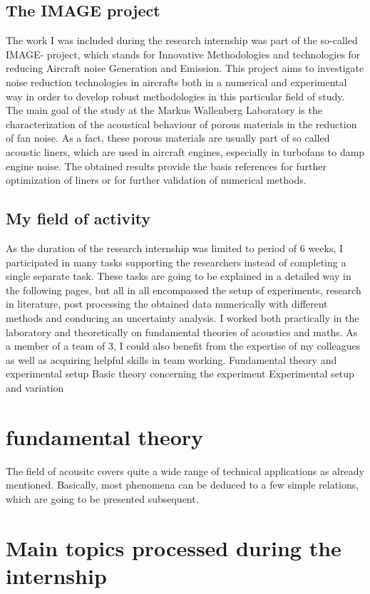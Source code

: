 \documentclass{article}
\begin{document}
\subsection{The IMAGE project} 
The work I was included during the research internship was part of the so-called IMAGE- project, which stands for Innovative Methodologies and technologies for reducing Aircraft noise Generation and Emission.
This project aims to investigate noise reduction technologies in aircrafts both in a numerical and experimental way in order to develop robust methodologies in this particular field of study.  
The main goal of the study at the Markus Wallenberg Laboratory is the characterization of the acoustical behaviour of porous materials in the reduction of fan noise.
As a fact, these porous materials are usually part of so called acoustic liners, which are used in aircraft engines, especially in turbofans to damp engine noise.
The obtained results provide the basis references for further optimization of liners or for further validation of numerical methods. 

\subsection{My field of activity} 
As the duration of the research internship was limited to period of 6 weeks, I participated in many tasks supporting the researchers instead of completing a single separate task.
These tasks are going to be explained in a detailed way in the following pages, but all in all encompassed the setup of experiments, research in literature, post processing the obtained data numerically with different methods and conducing an uncertainty analysis.
I worked both practically in the laboratory and theoretically on fundamental theories of acoustics and maths.
As a member of a team of 3, I could also benefit from the expertise of my colleagues as well as acquiring helpful skills in team working.
Fundamental theory and experimental setup
Basic theory concerning the experiment
Experimental setup and variation
\section{fundamental theory}
The field of acousitc covers quite a wide range of technical applications as already mentioned.
Basically, most phenomena can be deduced to a few simple relations, which are going to be presented subsequent. 
\section{Main topics processed during the internship}
\end{document}
